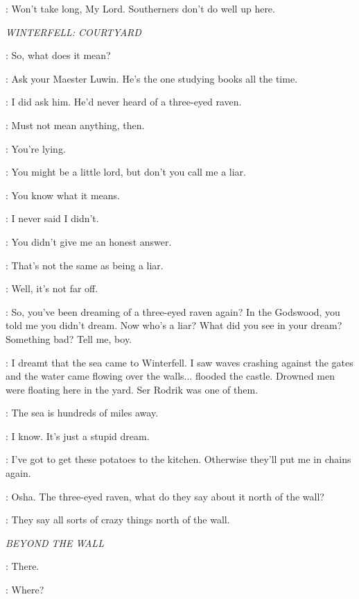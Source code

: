 \RODRIK: Won't take long, My Lord. Southerners don't do well up here. 


\scene

\textit{WINTERFELL: COURTYARD} 


\BRAN: So, what does it mean? 

\OSHA: Ask your Maester Luwin. He's the one studying books all the time. 

\BRAN: I did ask him. He'd never heard of a three-eyed raven. 

\OSHA: Must not mean anything, then. 

\BRAN: You're lying. 

\OSHA: You might be a little lord, but don't you call me a liar. 

\BRAN: You know what it means. 

\OSHA: I never said I didn't. 

\BRAN: You didn't give me an honest answer. 

\OSHA: That's not the same as being a liar. 

\BRAN: Well, it's not far off. 

\OSHA: So, you've been dreaming of a three-eyed raven again? In the Godswood, you told me you didn't dream. Now who's a liar? What did you see in your dream? Something bad? Tell me, boy. 

\BRAN: I dreamt that the sea came to Winterfell. I saw waves crashing against the gates and the water came flowing over the walls$\ldots$ flooded the castle. Drowned men were floating here in the yard. Ser Rodrik was one of them. 

\OSHA: The sea is hundreds of miles away. 

\BRAN: I know. It's just a stupid dream. 

\OSHA: I've got to get these potatoes to the kitchen. Otherwise they'll put me in chains again. 

\BRAN: Osha. The three-eyed raven, what do they say about it north of the wall? 

\OSHA: They say all sorts of crazy things north of the wall. 


\scene

\textit{BEYOND THE WALL} 


\HALFHAND: There. 

\JEOR: Where? 

